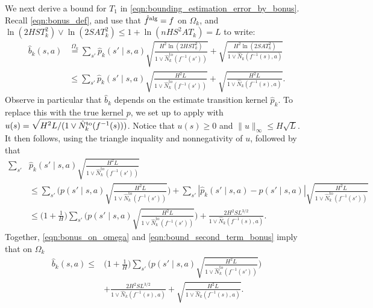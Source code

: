 \documentclass[11pt]{article}
\newcommand{\alg}{\textnormal{alg}}
\theoremstyle{definition}
\theoremstyle{definition}
\begin{document}
We next derive a bound for $T_1$ in \eqref{eqn:bounding_estimation_error_by_bonus}.
Recall \eqref{eqn:bonus_def}, and use that $\hat{f}^{\alg}=f$ on $\Omega_k$, and $\ln(2HST_k^2)\vee \ln(2SAT_k^2)\allowbreak \leq 1+\ln(nHS^2AT_k)=L$ to write:
\begin{equation}
	\label{eqn:bonus_on_omega}
	\begin{split}
		\hat{b}_k(s,a)
		 &
		\overset{\Omega_k}{=}
		\sum_{s'}
		\hat{p}_k(s'\mid s,a)\sqrt{\frac{H^2\ln(2HST_k^2)}{1\vee \hat{N}^{\mathrm{to}}_k(f^{-1}(s'))}}
		+
		\sqrt{\frac{H^2 \ln(2SAT_k^2)}{1\vee\hat{N}_k(f^{-1}(s), a)}}
		\\
		 &
		\leq
		\sum_{s'}
		\hat{p}_k(s'\mid s,a)\sqrt{\frac{H^2L}{1\vee \hat{N}^{\mathrm{to}}_k(f^{-1}(s'))}}
		+
		\sqrt{\frac{H^2 L}{1\vee\hat{N}_k(f^{-1}(s), a)}}
		.
	\end{split}
\end{equation}
Observe in particular that $\hat{b}_k$ depends on the estimate transition kernel $\hat{p}_k$.
To replace this with the true kernel $p$, we set up to apply  with $u(s) = \sqrt{\smash[b]{H^2L/(1\vee \hat{N}^{\mathrm{to}}_k(f^{-1}(s)))}}$.
Notice that $u(s)\geq 0$ and $\lVert u\rVert_{\infty} \leq H\sqrt{L}$.
It then follows, using the triangle inquality and nonnegativity of $u$, followed by  that
\begin{align}
	\sum_{s'}
	 &
	\hat{p}_k(s'\mid s,a)\sqrt{\frac{H^2L}{1\vee \hat{N}^{\mathrm{to}}_k(f^{-1}(s'))}}
	\nonumber
	\\
	 &
	\leq
	\sum_{s'}
	\biggl(p(s'\mid s,a)\sqrt{\frac{H^2L}{1\vee \hat{N}^{\mathrm{to}}_k(f^{-1}(s'))}}\biggr)
	+
	\sum_{s'}
	|\hat{p}_k(s'\mid s,a)-p(s'\mid s,a)|\sqrt{\frac{H^2L}{1\vee \hat{N}^{\mathrm{to}}_k(f^{-1}(s'))}}
	\nonumber
	\\
	 &
	\leq
	\biggl(1+\frac{1}{H}\biggr)\sum_{s'}\biggl(p(s'\mid s,a)\sqrt{\frac{H^2L}{1\vee \hat{N}^{\mathrm{to}}_k(f^{-1}(s'))}}\biggr)
	+
	\frac{2H^2SL^{3/2}}{1\vee\hat{N}_k(f^{-1}(s),a)}
	.
	\label{eqn:bound_second_term_bonus}
\end{align}
Together, \eqref{eqn:bonus_on_omega} and \eqref{eqn:bound_second_term_bonus} imply that on $\Omega_k$
\begin{equation}
	\label{eqn:bound_bonus}
	\begin{split}
		\hat{b}_k(s,a)
		\leq
		 &
		\biggl(1+\frac{1}{H}\biggr)\sum_{s'}\biggl(p(s'\mid s,a)\sqrt{\frac{H^2L}{1\vee \hat{N}^{\mathrm{to}}_k(f^{-1}(s'))}}\biggr)
		\\
		 &
		+
		\frac{2H^2SL^{3/2}}{1\vee\hat{N}_k(f^{-1}(s),a)}
		+
		\sqrt{\frac{H^2 L}{1\vee\hat{N}_k(f^{-1}(s), a)}}
		.
	\end{split}
\end{equation}
\end{document}
